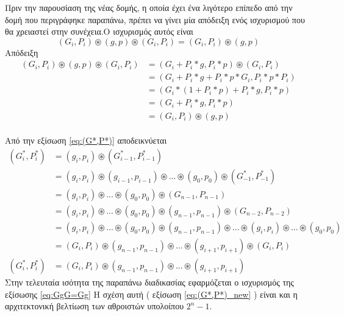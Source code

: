 Πριν την παρουσίαση της νέας δομής, η οποία έχει ένα λιγότερο επίπεδο από την δομή 
που περιγράφηκε παραπάνω, πρέπει να γίνει μία απόδειξη ενός ισχυρισμού που θα χρειαστεί στην 
συνέχεια.Ο ισχυρισμός αυτός είναι
\begin{equation}
\label{eq:GgG=Gg}
    (G_i,P_i)\circledast(g,p)\circledast(G_i,P_i) = (G_i,P_i)\circledast(g,p)
\end{equation}
Απόδειξη
\begin{equation*}
    \begin{split}
        (G_i,P_i)\circledast(g,p)\circledast(G_i,P_i) &= (G_i + P_i*g,P_i*p) \circledast (G_i,P_i) \\
        &= (G_i + P_i*g + P_i*p*G_i , P_i*p*P_i)\\
        &= (G_i*(1 + P_i*p) + P_i*g , P_i*p )\\
        &= (G_i + P_i*g , P_i * p)\\
        &= (G_i,P_i) \circledast (g,p)
    \end{split}
\end{equation*}
\\
Από την εξίσωση \ref{eq:(G*,P*)} αποδεικνύεται 
\begin{equation}
\label{eq:(G*,P*)_new}
    \begin{split}
        (G^*_i,P^*_i) &= (g_i,p_i) \circledast (G^*_{i-1},P^*_{i-1})\\
        &= (g_i,p_i) \circledast (g_{i-1},p_{i-1}) \circledast ... \circledast (g_0,p_0) \circledast (G^*_{-1},P^*_{-1})\\
        &= (g_i,p_i) \circledast ... \circledast (g_0,p_0) \circledast (G_{n-1},P_{n-1})\\
        &= (g_i,p_i) \circledast ... \circledast (g_0,p_0) \circledast (g_{n-1},p_{n-1}) \circledast (G_{n-2},P_{n-2})\\
        &= (g_i,p_i) \circledast ... \circledast (g_0,p_0) \circledast (g_{n-1},p_{n-1})
        \circledast ... \circledast (g_i,p_i) \circledast ... \circledast (g_0,p_0)\\
        &= (G_i,P_i) \circledast (g_{n-1},p_{n-1}) \circledast ... \circledast (g_{i+1},p_{i+1})
        \circledast (G_i,P_i)\\
        (G^*_i,P^*_i) &= (G_i,P_i) \circledast (g_{n-1},p_{n-1}) \circledast ... \circledast (g_{i+1},p_{i+1})
    \end{split}
\end{equation}
Στην τελευταία ισότητα της παραπάνω διαδικασίας εφαρμόζεται ο ισχυρισμός της εξίσωσης \ref{eq:GgG=Gg}
Η σχέση αυτή ( εξίσωση \ref{eq:(G*,P*)_new} ) είναι και η αρχιτεκτονική βελτίωση των αθροιστών υπολοίπου
$2^n-1$.

